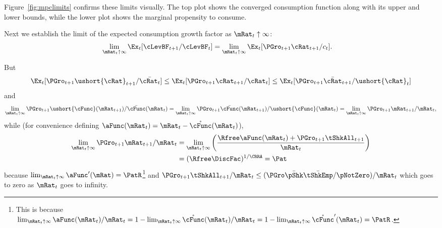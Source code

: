 \documentclass[BufferStockTheory]{subfiles}
\begin{document}
Figure~\ref{fig:mpclimits} confirms these limits visually.  The top
plot shows the converged consumption function along with its upper and lower bounds,
while the lower plot shows the marginal propensity to consume.
\renewcommand{\figFile}{mpclimits}
\hypertarget{\figFile}{}


\renewcommand{\figFile}{cFuncBounds}
\hypertarget{\figFile}{}



Next we establish the limit of the expected consumption growth factor
as $\mRat_{t} \uparrow \infty$:
\begin{align*}
  \lim_{\mRat_{t} \uparrow \infty} \Ex_{t}[
  \cLevBF_{t+1}/\cLevBF_{t}]  & = \lim_{\mRat_{t} \uparrow \infty} \Ex_{t}[
                                {\PGro}_{t+1} {\cRat}_{t+1}/c_{t}]. 
\end{align*}

But
\begin{align*}
  \Ex_{t}[{\PGro}_{t+1} {\ushort{\cRat}}_{t+1}/\bar{\cRat_{t}}] \leq \Ex_{t}[{\PGro}_{t+1} {\cRat}_{t+1}/\cRat_{t}] \leq \Ex_{t}[{\PGro}_{t+1} {\bar{\cRat}}_{t+1}/\ushort{\cRat}_{t}]
\end{align*}
and
\begin{equation*}  \label{eq:xttoinfty}
  \lim_{\mRat_t \uparrow \infty} \PGro_{t+1}\ushort{\cFunc}(\mRat_{t+1})/\bar{\cFunc}(\mRat_t) =
  \lim_{\mRat_{t} \uparrow \infty} \PGro_{t+1}\bar{\cFunc}(\mRat_{t+1})/\ushort{\cFunc}(\mRat_t) =
  \lim_{\mRat_{t} \uparrow \infty}\PGro_{t+1} \mRat_{t+1}/\mRat_t,  
\end{equation*}
while (for convenience defining $\aFunc(\mRat_{t})=\mRat_{t}-\mathring{\cFunc}(\mRat_{t})$), \hypertarget{xtp1toinfty}{}
\begin{align}  \label{eq:xtp1toinfty}
  \lim_{\mRat_{t} \uparrow \infty} \PGro_{t+1} \mRat_{t+1}/\mRat_t  & = \lim_{\mRat_{t} \uparrow \infty}
                                                                  \left(\frac{\Rfree \aFunc(\mRat_t)+{\PGro}_{t+1}\tShkAll_{t+1}}{\mRat_t}\right)
  \\  & = (\Rfree \DiscFac)^{1/\CRRA} = \Pat \notag
\end{align}
because $\lim_{\mRat_{t}\uparrow \infty} \aFunc^{\prime}(\mRat)=\PatR$\footnote{This is because $\lim_{\mRat_{t}\uparrow \infty} \aFunc(\mRat_{t})/\mRat_{t}=1-\lim_{\mRat_{t}\uparrow \infty} \mathring{\cFunc}(\mRat_{t})/\mRat_{t}=1-\lim_{\mRat_{t}\uparrow \infty}\mathring{\cFunc}^{\prime}(\mRat_{t})=\PatR$.} and
$\PGro_{t+1}\tShkAll_{t+1}/\mRat_{t} \leq (\PGro \bar{\pShk} \bar{\tShkEmp}/\pNotZero )/\mRat_{t}$ which
goes to zero as $\mRat_{t}$ goes to infinity.
\end{document}
